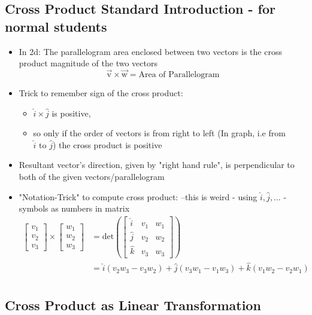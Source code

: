 \documentclass[a4paper]{article}
\begin{document}
\subsection{Cross Product Standard Introduction - for normal students}
\begin{itemize}
	\item In 2d: The parallelogram area enclosed between two
	      vectors is the cross product magnitude of the two
	      vectors
	      \[
		      \vec{\text{v}}
		      \times
		      \vec{\text{w}}
		      = \text{Area of Parallelogram}
	      \]
	\item Trick to remember sign of the cross product:
	      \begin{itemize}
		      \item $\hat{i} \times \hat{j}$ is positive,
		      \item so only if the order of vectors is from right to left
		            (In graph, i.e from $\hat{i} \text{ to } \hat{j}$)
		            the cross product is positive
	      \end{itemize}
	\item Resultant vector's direction, given by "right hand rule", is
	      perpendicular to both of the given vectors/parallelogram
	\item "Notation-Trick" to compute cross product: --this is weird
	      - using $\hat{i}, \hat{j}, \ldots$ - symbols as numbers in matrix
	      \begin{align*}
		      \begin{bmatrix}
			      v_1 \\
			      v_2 \\
			      v_3\end{bmatrix}
		      \times
		      \begin{bmatrix}
			      w_1 \\
			      w_2 \\
			      w_3\end{bmatrix}
		       & = \text{det}\left(
		      \begin{bmatrix}
				      \hat{i} & v_1 & w_1 \\
				      \hat{j} & v_2 & w_2 \\
				      \hat{k} & v_3 & w_3\end{bmatrix}
		      \right)                       \\
		       & = \hat{i}(v_2w_3 - v_3w_2)
		      + \hat{j}(v_3w_1 - v_1w_3)
		      + \hat{k}(v_1w_2 - v_2w_1)    \\
	      \end{align*}
\end{itemize}

\subsection{Cross Product as Linear Transformation}
\end{document}
